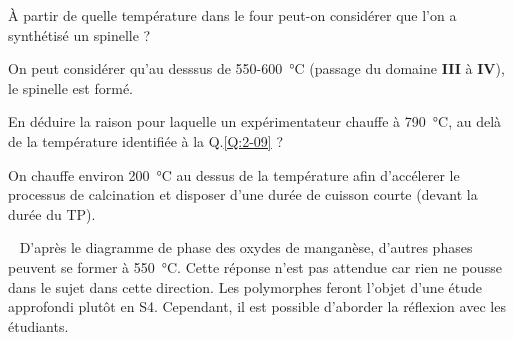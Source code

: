 \documentclass[twoside,a4paper,11pt,addpoints,answers]{exam}%
\newcounter{foo} %
\begin{document}
\begin{questions}

\question[\half] \label{Q:2-09} \`{A} partir de quelle température dans le four peut-on considérer que l'on a synthétisé un spinelle ?

\begin{mybox}\begin{solution}[2cm]
On peut considérer qu'au desssus de 550-\SI{600}{\celsius} (passage du domaine \textbf{III} à \textbf{IV}), le spinelle est formé.
\end{solution}\end{mybox}

\question[\half] \label{Q:2-10} En déduire la raison pour laquelle un expérimentateur chauffe à \SI{790}{\celsius}, au delà de la température identifiée à la Q.\ref{Q:2-09} ?

\begin{mybox}\begin{solution}[2cm]
On chauffe environ \SI{200}{\celsius} au dessus de la température afin d'accélerer le processus de calcination et disposer d'une durée de cuisson courte (devant la durée du TP). 

\faWarning ~ D'après le diagramme de phase des oxydes de manganèse, d'autres phases peuvent se former à \SI{550}{\celsius}. Cette réponse n'est pas attendue car rien ne pousse dans le sujet dans cette direction. Les polymorphes feront l'objet d'une étude approfondi plutôt en S4. Cependant, il est possible d'aborder la réflexion avec les étudiants.
\end{solution}\end{mybox}


\setcounter{foo}{\value{question}}
\end{questions}
\end{document}

